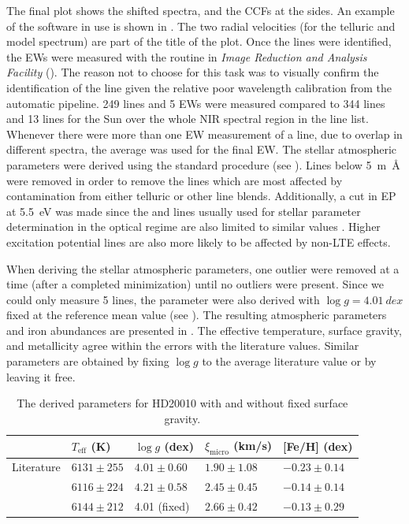 The final plot shows the shifted spectra, and the CCFs at the sides. An example of the software in
use is shown in . The two radial velocities (for the telluric and
model spectrum) are part of the title of the plot. Once the lines were identified, the EWs were
measured with the  routine in \emph{Image Reduction and Analysis Facility}
(). The reason not to choose  for this task was to visually confirm the
identification of the line given the relative poor wavelength calibration from the automatic
pipeline. 249  lines and 5  EWs were measured compared to 344 
lines and 13  lines for the Sun over the whole NIR spectral region in the line list.
Whenever there were more than one EW measurement of a line, due to overlap in different spectra, the
average was used for the final EW. The stellar atmospheric parameters were derived using the
standard procedure (see ). Lines below \SI{5}{m\angstrom} were removed in order
to remove the lines which are most affected by contamination from either telluric or other line
blends. Additionally, a cut in EP at \SI{5.5}{eV} was made since the  and 
lines usually used for stellar parameter determination in the optical regime are also limited to
similar values \citep[see e.g][]{Sousa2008a}. Higher excitation potential lines are also more likely
to be affected by non-LTE effects.

When deriving the stellar atmospheric parameters, one outlier were removed at a time (after a
completed minimization) until no outliers were present. Since we could only measure 5 
lines, the parameter were also derived with $\log g=\SI{4.01}{dex}$ fixed at the reference mean
value (see ). The resulting atmospheric parameters and iron abundances are
presented in . The effective temperature, surface gravity, and metallicity
agree within the errors with the literature values. Similar parameters are obtained by fixing $\log
g$ to the average literature value or by leaving it free.

\begin{table}[htb!]
    \caption{The derived parameters for HD20010 with and without fixed surface gravity.}
    \label{tab:HD20010_results}
    \centering
    \begin{tabular}{lllll}
      \hline\hline
                     & $T_\mathrm{eff}$ (K) &  $\log g$ (dex)  &   $\xi_\mathrm{micro}$ (km/s)  & [Fe/H] (dex)      \\
      \hline
        Literature   & $6131 \pm 255$       &  $4.01 \pm 0.60$ &    $1.90 \pm 1.08$              & $-0.23 \pm 0.14$ \\
      \hline
                     & $6116 \pm 224$       &  $4.21 \pm 0.58$ &    $2.45 \pm 0.45$              & $-0.14 \pm 0.14$ \\
                     & $6144 \pm 212$       &   4.01 (fixed)   &    $2.66 \pm 0.42$              & $-0.13 \pm 0.29$ \\
      \hline
    \end{tabular}
\end{table}

